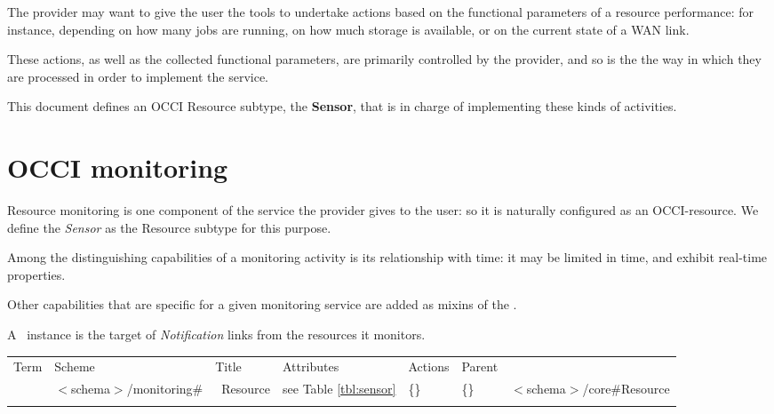 \documentclass[10pt,a4paper]{article}
\begin{document}
The provider may want to give the user the tools to undertake actions based on the functional parameters of a resource performance: for instance, depending on how many jobs are running, on how much storage is available, or on the current state of a WAN link.

These actions, as well as the collected functional parameters, are  primarily controlled by the provider, and so is the the way in which they are processed in order to implement the service.

This document defines an OCCI Resource subtype, the {\bf Sensor}, that is in charge of implementing these kinds of activities.

\section{OCCI monitoring}

Resource monitoring is one component of the service the provider gives to the user: so it is naturally configured as an OCCI-resource. We define the {\em Sensor} as the Resource subtype for this purpose.

Among the distinguishing capabilities of a monitoring activity is its relationship with time: it may be limited in time, and exhibit real-time properties.

Other capabilities that are specific for a given monitoring service are added as mixins of the \sens.

A \sens\ instance is the target of {\em Notification} links from the resources it monitors.




 {
	\begin{tabular}{lllllll}
	\toprule
	Term & Scheme & Title & Attributes & Actions & Parent \\
	\colrule
	\sens &  $<$schema$>$/monitoring\# & \sens\ Resource
	& see Table \ref{tbl:sensor} & \{\} & \{\} & $<$schema$>$/core\#Resource \\
	\botrule
	\end{tabular}
}
\end{document}
